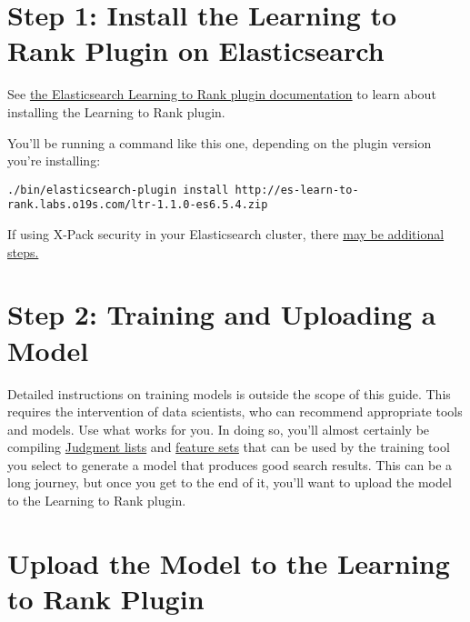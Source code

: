 \noindent\hrulefill

\section{Step 1: Install the Learning to Rank Plugin on
Elasticsearch}\label{step-1-install-the-learning-to-rank-plugin-on-elasticsearch}

See
\href{https://elasticsearch-learning-to-rank.readthedocs.io/en/latest/\#installing}{the
Elasticsearch Learning to Rank plugin documentation} to learn about
installing the Learning to Rank plugin.

You'll be running a command like this one, depending on the plugin
version you're installing:

\begin{verbatim}
./bin/elasticsearch-plugin install http://es-learn-to-rank.labs.o19s.com/ltr-1.1.0-es6.5.4.zip
\end{verbatim}

If using X-Pack security in your Elasticsearch cluster, there
\href{https://elasticsearch-learning-to-rank.readthedocs.io/en/latest/x-pack.html}{may
be additional steps.}

\section{Step 2: Training and Uploading a
Model}\label{step-2-training-and-uploading-a-model}

Detailed instructions on training models is outside the scope of this
guide. This requires the intervention of data scientists, who can
recommend appropriate tools and models. Use what works for you. In doing
so, you'll almost certainly be compiling
\href{https://elasticsearch-learning-to-rank.readthedocs.io/en/latest/core-concepts.html\#judgments-expression-of-the-ideal-ordering}{Judgment
lists} and
\href{https://elasticsearch-learning-to-rank.readthedocs.io/en/latest/building-features.html}{feature
sets} that can be used by the training tool you select to generate a
model that produces good search results. This can be a long journey, but
once you get to the end of it, you'll want to upload the model to the
Learning to Rank plugin.

\section{Upload the Model to the Learning to Rank
Plugin}\label{upload-the-model-to-the-learning-to-rank-plugin}

